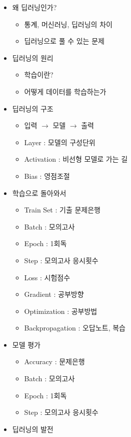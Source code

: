 \documentclass[11pt]{article}
\providecommand{\tightlist}{%
      \setlength{\itemsep}{0pt}\setlength{\parskip}{0pt}}
\begin{document}
\begin{itemize}
\tightlist
\item
  왜 딥러닝인가?

  \begin{itemize}
  \tightlist
  \item
    통계, 머신러닝, 딥러닝의 차이
  \item
    딥러닝으로 풀 수 있는 문제
  \end{itemize}
\item
  딥러닝의 원리

  \begin{itemize}
  \tightlist
  \item
    학습이란?
  \item
    어떻게 데이터를 학습하는가
  \end{itemize}
\item
  딥러닝의 구조

  \begin{itemize}
  \tightlist
  \item
    입력 \(\rightarrow\) 모델 \(\rightarrow\) 출력
  \item
    Layer : 모델의 구성단위
  \item
    Activation : 비선형 모델로 가는 길
  \item
    Bias : 영점조절
  \end{itemize}
\item
  학습으로 돌아와서

  \begin{itemize}
  \tightlist
  \item
    Train Set : 기출 문제은행
  \item
    Batch : 모의고사
  \item
    Epoch : 1회독
  \item
    Step : 모의고사 응시횟수
  \item
    Loss : 시험점수
  \item
    Gradient : 공부방향
  \item
    Optimization : 공부방법
  \item
    Backpropagation : 오답노트, 복습
  \end{itemize}
\item
  모델 평가

  \begin{itemize}
  \tightlist
  \item
    Accuracy : 문제은행
  \item
    Batch : 모의고사
  \item
    Epoch : 1회독
  \item
    Step : 모의고사 응시횟수
  \end{itemize}
\item
  딥러닝의 발전


\end{itemize}
\end{document}
